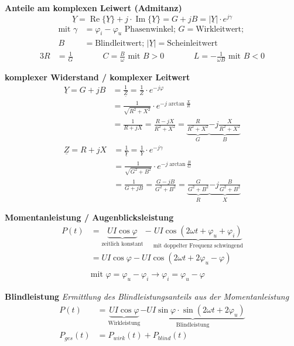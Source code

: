 \textbf{Anteile am komplexen Leiwert (Admitanz)}
\[\underline{Y} = \operatorname{Re}\{\underline{Y}\} + j \cdot \operatorname{Im}\{\underline{Y}\} = G + jB = \left|\underline{Y}\right| \cdot e^{j\gamma}\]
\begin{align*}
\text{mit }\gamma &= \varphi_i - \varphi_u \text{ Phasenwinkel; } G = \text{Wirkleitwert; } \\ B &= \text{Blindleitwert; } \left|\underline{Y}\right| = \text{Scheinleitwert }
\end{align*}
\begin{alignat*}{3}
R&=\frac{1}{G} &\quad\quad& C=\frac{B}{\omega} \text{ mit } B>0 &\quad\quad& L=-\frac{1}{\omega B} \text{ mit } B<0
\end{alignat*}

\textbf{komplexer Widerstand / komplexer Leitwert}
\begin{align*}
\underline{Y} = G + jB &= \frac{1}{\underline{Z}} = \frac{1}{Z} \cdot e^{-j\varphi} \\
	      &= \frac{1}{\sqrt{R^2 + X^2}} \cdot e^{-j\arctan\frac{X}{R}} \\
	      &= \frac{1}{R + jX} = \frac{R-jX}{R^2 + X^2} = \underbrace{\frac{R}{R^2 + X^2}}_G \underbrace{-j\frac{X}{R^2 + X^2}}_B
\end{align*}
\begin{align*}
\underline{Z} = R + jX &= \frac{1}{\underline{Y}} = \frac{1}{Y} \cdot e^{-j\gamma} \\
	      &= \frac{1}{\sqrt{G^2 + B^2}} \cdot e^{-j\arctan\frac{B}{G}} \\
	      &= \frac{1}{G + jB} = \frac{G-jB}{G^2 + B^2} = \underbrace{\frac{G}{G^2 + B^2}}_R \underbrace{-j\frac{B}{G^2 + B^2}}_X
\end{align*}

\textbf{Momentanleistung / Augenblicksleistung}
\begin{align*}
P\left(t\right) &= \underbrace{UI \cos \varphi}_{\text{zeitlich konstant}} - \underbrace{UI \cos \left(2 \omega t + \varphi_u + \varphi_i\right)}_{\text{mit doppelter Frequenz schwingend}} \\
		&= UI \cos \varphi - UI \cos \left(2 \omega t + 2\varphi_u - \varphi\right) \\ \\
		&\text{mit } \varphi = \varphi_u - \varphi_i \rightarrow \varphi_i = \varphi_u - \varphi
\end{align*}

\textbf{Blindleistung}
\emph{Ermittlung des Blindleistungsanteils aus der Momentanleistung}
\begin{align*}
P\left(t\right) &= \underbrace{UI\cos\varphi}_{\text{Wirkleistung}}\underbrace{-UI\sin\varphi\cdot\sin\left(2\omega t + 2\varphi_u\right)}_{\text{Blindleistung}} \\
P_{ges}\left(t\right) &= P_{wirk}\left(t\right) + P_{blind}\left(t\right)
\end{align*}

